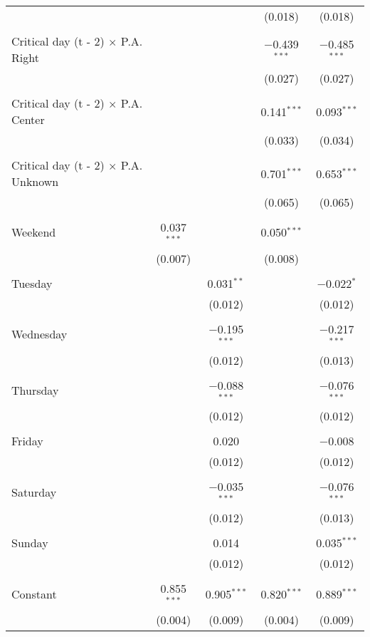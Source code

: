 \documentclass[
]{article}
\begin{document}
\begin{table}[!htbp]
{\begin{tabular}{@{\extracolsep{5pt}}lcccc}
  &  &  & (0.018) & (0.018) \\ 
  & & & & \\ 
 Critical day (t - 2) $\times$ P.A. Right &  &  & $-$0.439$^{***}$ & $-$0.485$^{***}$ \\ 
  &  &  & (0.027) & (0.027) \\ 
  & & & & \\ 
 Critical day (t - 2) $\times$ P.A. Center &  &  & 0.141$^{***}$ & 0.093$^{***}$ \\ 
  &  &  & (0.033) & (0.034) \\ 
  & & & & \\ 
 Critical day (t - 2) $\times$ P.A. Unknown &  &  & 0.701$^{***}$ & 0.653$^{***}$ \\ 
  &  &  & (0.065) & (0.065) \\ 
  & & & & \\ 
 Weekend & 0.037$^{***}$ &  & 0.050$^{***}$ &  \\ 
  & (0.007) &  & (0.008) &  \\ 
  & & & & \\ 
 Tuesday &  & 0.031$^{**}$ &  & $-$0.022$^{*}$ \\ 
  &  & (0.012) &  & (0.012) \\ 
  & & & & \\ 
 Wednesday &  & $-$0.195$^{***}$ &  & $-$0.217$^{***}$ \\ 
  &  & (0.012) &  & (0.013) \\ 
  & & & & \\ 
 Thursday &  & $-$0.088$^{***}$ &  & $-$0.076$^{***}$ \\ 
  &  & (0.012) &  & (0.012) \\ 
  & & & & \\ 
 Friday &  & 0.020 &  & $-$0.008 \\ 
  &  & (0.012) &  & (0.012) \\ 
  & & & & \\ 
 Saturday &  & $-$0.035$^{***}$ &  & $-$0.076$^{***}$ \\ 
  &  & (0.012) &  & (0.013) \\ 
  & & & & \\ 
 Sunday &  & 0.014 &  & 0.035$^{***}$ \\ 
  &  & (0.012) &  & (0.012) \\ 
  & & & & \\ 
 Constant & 0.855$^{***}$ & 0.905$^{***}$ & 0.820$^{***}$ & 0.889$^{***}$ \\ 
  & (0.004) & (0.009) & (0.004) & (0.009) \\ 

\end{tabular}}
\end{table}
\end{document}
